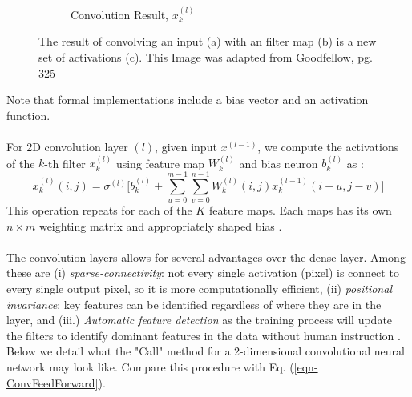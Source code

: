 \documentclass[12pt,letterpaper]{article}
\begin{document}
\begin{figure}[H]
\begin{center}
\begin{subfigure}{0.9\textwidth}
	\caption{Convolution Result, $x^{(l)}_k$}
	\end{subfigure}	
\end{center}
\caption{The result of convolving an input (a) with an filter map (b) is a new set of activations (c). This Image was adapted from Goodfellow, pg. 325 \cite{Goodfellow}}
\label{fig-2DConvExample}
\end{figure}
Note that formal implementations include a bias vector and an activation function.

\paragraph*{}For 2D convolution layer $(l)$, given input $x^{(l-1)}$, we compute the activations of the $k$-th filter $x^{(l)}_{k}$ using feature map $W^{(l)}_k$ and bias neuron $b^{(l)}_k$ as \cite{Goodfellow}:
\begin{equation}
\label{eqn-ConvFeedForward}
x^{(l)}_k(i,j) = \sigma^{(l)}\bigg[ b^{(l)}_k +  \sum_{u=0}^{m-1} \sum_{v=0}^{n-1} W^{(l)}_k(i,j) x^{(l-1)}_k(i - u,j - v) \bigg]
\end{equation}
This operation repeats for each of the $K$ feature maps. Each maps has its own $n \times m$ weighting matrix and appropriately shaped bias .

\paragraph*{}The convolution layers allows for several advantages over the dense layer. Among these are (i) \textit{sparse-connectivity}: not every single activation (pixel) is connect to every single output pixel, so it is more computationally efficient, (ii) \textit{positional invariance}: key features can be identified regardless of where they are in the layer, and (iii.) \textit{Automatic feature detection} as the training process will update the filters to identify dominant features in the data without human instruction \cite{Geron,Goodfellow,Loy}. Below we detail what the "Call" method for a 2-dimensional convolutional neural network may look like. Compare this procedure with Eq. (\ref{eqn-ConvFeedForward}).
\end{document}
